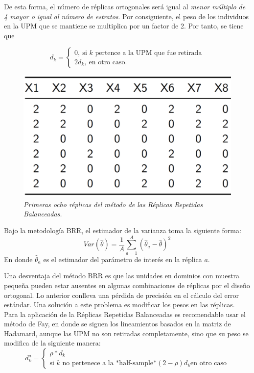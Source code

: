 \documentclass[
  10pt,
  spanish,
]{book}
\begin{document}
De esta forma, el número de réplicas ortogonales será igual al \emph{menor múltiplo de 4 mayor o igual al número de estratos}. Por consiguiente, el peso de los individuos en la UPM que se mantiene se multiplica por un factor de 2. Por tanto, se tiene que

\[
d_{k} = 
\begin{cases}
0, \ \text{si $k$ pertence a la UPM que fue retirada}\\
2d_k, \ \text{en otro caso.}
\end{cases}
\]

\begin{figure}
\centering
\includegraphics{Pics/21.png}
\caption{\emph{Primeras ocho réplicas del método de las Réplicas Repetidas Balanceadas.}}
\end{figure}

Bajo la metodología BRR, el estimador de la varianza toma la siguiente forma:
\[
Var(\hat{\theta}) = \frac{1}{A}\sum_{a=1}^A(\hat{\theta}_a - \hat\theta )^2
\]
En donde \(\hat{\theta}_a\) es el estimador del parámetro de interés en la réplica \(a\).

Una desventaja del método BRR es que las unidades en dominios con muestra pequeña pueden estar ausentes en algunas combinaciones de réplicas por el diseño ortogonal. Lo anterior conlleva una pérdida de precisión en el cálculo del error estándar. Una solución a este problema es modificar los pesos en las réplicas. Para la aplicación de la Réplicas Repetidas Balanceadas es recomendable usar el método de Fay, en donde se siguen los lineamientos basados en la matriz de Hadamard, aunque las UPM no son retiradas completamente, sino que su peso se modifica de la siguiente manera:
\[
d_k^a=
\begin{cases}
\rho*d_k\\ \text{si $k$ no pertenece a la *half-sample*}
(2-\rho)d_k \text{en otro caso}
\end{cases}
\]
\end{document}
